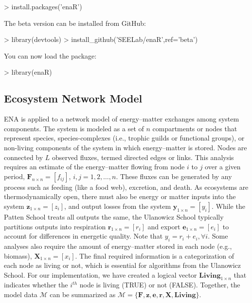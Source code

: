 \documentclass[article]{jss}
\begin{document}
\begin{Schunk}
\begin{Sinput}
> install.packages('enaR')
\end{Sinput}
\end{Schunk}

The beta version can be installed from GitHub:

\begin{Schunk}
\begin{Sinput}
> library(devtools)
> install_github('SEELab/enaR',ref='beta')
\end{Sinput}
\end{Schunk}

You can now load the package:

\begin{Schunk}
\begin{Sinput}
> library(enaR)
\end{Sinput}
\end{Schunk}





\subsection{Ecosystem Network Model}

ENA is applied to a network model of energy--matter exchanges among
system components.  The system is modeled as a set of $n$ compartments
or nodes that represent species, species-complexes (i.e., trophic
guilds or functional groups), or non-living components of the system
in which energy--matter is stored.  Nodes are connected by $L$
observed fluxes, termed directed edges or links.  This analysis
requires an estimate of the energy--matter flowing from node $i$ to
$j$ over a given period, $\mathbf{F}_{n\times n}=[f_{ij}]$,
$i,j=1,2,\ldots,n$.  These fluxes can be generated by any process such
as feeding (like a food web), excretion, and death.  As ecosystems are
thermodynamically open, there must also be energy or matter inputs into
the system $\mathbf{z}_{1 \times n}=[z_i]$, and output losses from the
system $\mathbf{y}_{1 \times n}=[y_i]$.  While the Patten School treats
all outputs the same, the Ulanowicz School typically partitions
outputs into respiration $\mathbf{r}_{1\times n}=[r_i]$ and export
$\mathbf{e}_{1\times n}=[e_i]$ to account for differences in energetic
quality. Note that $y_i = r_i + e_i, \forall i$.  Some analyses
also require the amount of energy--matter stored in each node (e.g.,
biomass), $\mathbf{X}_{1\times n}=[x_i]$.  The final required
information is a categorization of each node as living or not, which
is essential for algorithms from the Ulanowicz School.  For
our implementation, we have created a logical vector $\mathbf{Living}_{1 \times
  n}$ that indicates whether the $i^{th}$ node is living (TRUE)
or not (FALSE).  Together, the model data $\mathcal{M}$ can be
summarized as $\mathcal{M} =
\{\mathbf{F}, \mathbf{z}, \mathbf{e}, \mathbf{r}, \mathbf{X}, \mathbf{Living}\}$.
\end{document}
